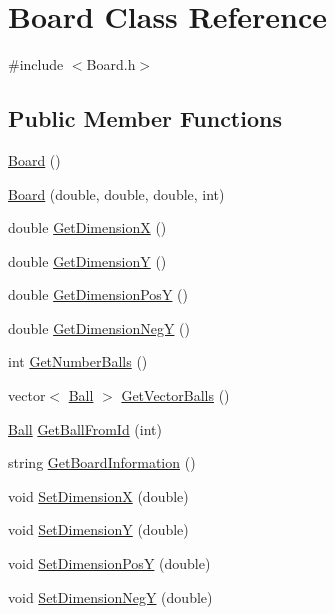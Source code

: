 \hypertarget{classBoard}{\section{Board Class Reference}
\label{classBoard}
}


{\ttfamily \#include $<$Board.\+h$>$}

\subsection*{Public Member Functions}
\begin{DoxyCompactItemize}
\item 
\hyperlink{classBoard_a9ee491d4fea680cf69b033374a9fdfcb}{Board} ()
\item 
\hyperlink{classBoard_af26e9eedabd3559a0a823594a9836a9c}{Board} (double, double, double, int)
\item 
double \hyperlink{classBoard_a6004dec19aa29da6fffee5ceec0a13ae}{Get\+Dimension\+X} ()
\item 
double \hyperlink{classBoard_a5d90ba60a138223ce0dc9679d50fbdb8}{Get\+Dimension\+Y} ()
\item 
double \hyperlink{classBoard_ab7819a7d8bbf610e55f6f231f18ff9a3}{Get\+Dimension\+Pos\+Y} ()
\item 
double \hyperlink{classBoard_a8926b3f18919d74e27f0b1e5f83575aa}{Get\+Dimension\+Neg\+Y} ()
\item 
int \hyperlink{classBoard_a626fb9f489b8bdf89d08c6b49b3e7555}{Get\+Number\+Balls} ()
\item 
vector$<$ \hyperlink{classBall}{Ball} $>$ \hyperlink{classBoard_a3b6346e52d69e15ddba100248cfe4789}{Get\+Vector\+Balls} ()
\item 
\hyperlink{classBall}{Ball} \hyperlink{classBoard_ad7661f151aa307b5cf3c4a7aa809ced4}{Get\+Ball\+From\+Id} (int)
\item 
string \hyperlink{classBoard_a4963e139df9b877cdd57770e01d26d7a}{Get\+Board\+Information} ()
\item 
void \hyperlink{classBoard_a770d11a85df68916f931e457028be6eb}{Set\+Dimension\+X} (double)
\item 
void \hyperlink{classBoard_ac370e9c8e7abcdc0be8d9f4e0e5a3306}{Set\+Dimension\+Y} (double)
\item 
void \hyperlink{classBoard_aa8ba59ef5749feffbab76cff0c87827a}{Set\+Dimension\+Pos\+Y} (double)
\item 
void \hyperlink{classBoard_a71d25a54a0c1fe932e1bbebb85364b16}{Set\+Dimension\+Neg\+Y} (double)
\item 

\end{DoxyCompactItemize}
